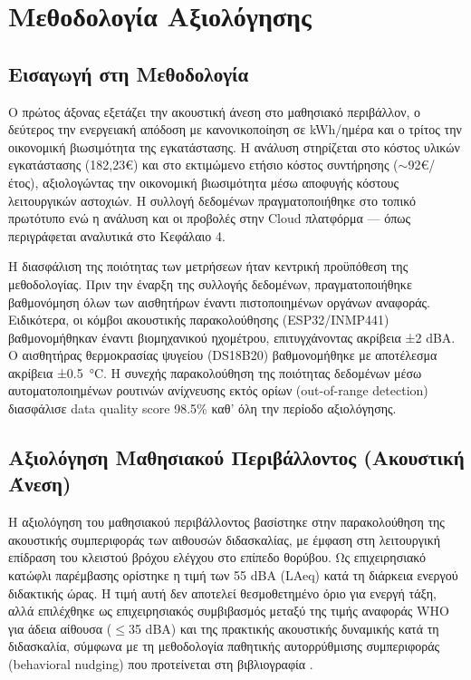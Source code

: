 \chapter{Μεθοδολογία Αξιολόγησης}

\section{Εισαγωγή στη Μεθοδολογία}
Ο πρώτος άξονας εξετάζει την ακουστική άνεση στο μαθησιακό περιβάλλον, ο δεύτερος την ενεργειακή απόδοση με κανονικοποίηση σε \textlatin{kWh}/ημέρα και ο τρίτος την οικονομική βιωσιμότητα της εγκατάστασης. Η ανάλυση στηρίζεται στο κόστος υλικών εγκατάστασης (182,23\euro) και στο εκτιμώμενο ετήσιο κόστος συντήρησης ($\sim$92\euro/έτος), αξιολογώντας την οικονομική βιωσιμότητα μέσω αποφυγής κόστους λειτουργικών αστοχιών. Η συλλογή δεδομένων πραγματοποιήθηκε στο τοπικό πρωτότυπο ενώ η ανάλυση και οι προβολές στην \textlatin{Cloud} πλατφόρμα --- όπως περιγράφεται αναλυτικά στο Κεφάλαιο 4.

Η διασφάλιση της ποιότητας των μετρήσεων ήταν κεντρική προϋπόθεση της μεθοδολογίας. Πριν την έναρξη της συλλογής δεδομένων, πραγματοποιήθηκε βαθμονόμηση όλων των αισθητήρων έναντι πιστοποιημένων οργάνων αναφοράς. Ειδικότερα, οι κόμβοι ακουστικής παρακολούθησης (\textlatin{ESP32/INMP441}) βαθμονομήθηκαν έναντι βιομηχανικού ηχομέτρου, επιτυγχάνοντας ακρίβεια ±2 \textlatin{dBA}. Ο αισθητήρας θερμοκρασίας ψυγείου (\textlatin{DS18B20}) βαθμονομήθηκε με αποτέλεσμα ακρίβεια ±0.5~\textlatin{°C}. Η συνεχής παρακολούθηση της ποιότητας δεδομένων μέσω αυτοματοποιημένων ρουτινών ανίχνευσης εκτός ορίων (\textlatin{out-of-range detection}) διασφάλισε \textlatin{data quality score} 98.5\% καθ' όλη την περίοδο αξιολόγησης.

\section{Αξιολόγηση Μαθησιακού Περιβάλλοντος (Ακουστική Άνεση)}
Η αξιολόγηση του μαθησιακού περιβάλλοντος βασίστηκε στην παρακολούθηση της ακουστικής συμπεριφοράς των αιθουσών διδασκαλίας, με έμφαση στη λειτουργική επίδραση του κλειστού βρόχου ελέγχου στο επίπεδο θορύβου. Ως επιχειρησιακό κατώφλι παρέμβασης ορίστηκε η τιμή των 55 \textlatin{dBA} (\textlatin{LAeq}) κατά τη διάρκεια ενεργού διδακτικής ώρας. Η τιμή αυτή δεν αποτελεί θεσμοθετημένο όριο για ενεργή τάξη, αλλά επιλέχθηκε ως επιχειρησιακός συμβιβασμός μεταξύ της τιμής αναφοράς \textlatin{WHO} για άδεια αίθουσα ($\leq$35 \textlatin{dBA}) \cite{WHO1999, Kephalopoulos2015} και της πρακτικής ακουστικής δυναμικής κατά τη διδασκαλία, σύμφωνα με τη μεθοδολογία παθητικής αυτορρύθμισης συμπεριφοράς (\textlatin{behavioral nudging}) που προτείνεται στη βιβλιογραφία \cite{MogasRecalde2021}.

